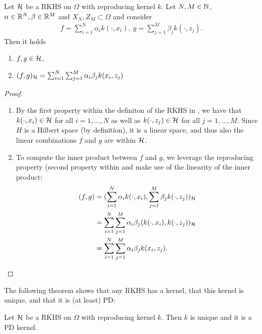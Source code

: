 \begin{prop}
\label{prop:rkhs_1}
Let $\mathcal{H}$ be a RKHS on $\Omega$ with reproducing kernel $k$. 
Let $N, M \in \mathbb{N}$, $\alpha \in \mathbb{R}^N, \beta \in \mathbb{R}^M$ and $X_N, Z_M \subset \Omega$ and consider
\begin{align*}
f = \sum_{i=1}^N \alpha_i k(\cdot, x_i), ~ g = \sum_{j=1}^M \beta_j k(\cdot, z_j).
\end{align*}
Then it holds
\begin{enumerate}
\item $f, g \in \mathcal{H}$,
\item $(f, g)_{\mathcal{H}} = \sum_{i=1}^N \sum_{j=1}^M \alpha_i \beta_j k(x_i, z_j)$ 
\end{enumerate}
\end{prop}

\begin{proof}
\begin{enumerate}
\item By the first property within the definiton of the RKHS in , 
we have that $k(\cdot, x_i) \in \mathcal{H}$ for all $i=1, ..., N$ as well as $k(\cdot, z_j) \in \mathcal{H}$ for all $j = 1, ..., M$.
Since $H$ is a Hilbert space (by definition), it is a linear space, 
and thus also the linear combinations $f$ and $g$ are within $\mathcal{H}$.
\item To compute the inner product between $f$ and $g$, we leverage the reproducing property (second property within  and make use of the linearity of the inner product:
\begin{align*}
(f, g) &= (\sum_{i=1}^N \alpha_i k(\cdot, x_i), \sum_{j=1}^M \beta_j k(\cdot, z_j))_{\mathcal{H}} \\
&= \sum_{i=1}^N \sum_{j=1}^M \alpha_i \beta_j (k(\cdot, x_i),  k(\cdot, z_j))_{\mathcal{H}} \\
&= \sum_{i=1}^N \sum_{j=1}^M \alpha_i \beta_j k(x_i, z_j).
\end{align*}
\end{enumerate}

\end{proof}

The following theorem shows that any RKHS has a kernel, that this kernel is unique, and that it is (at least) PD:


\begin{thm}
\label{thm:rkhs_1}
Let $\mathcal{H}$ be a RKHS on $\Omega$ with reproducing kernel $k$.
Then $k$ is unique and it is a PD kernel.
\end{thm}


